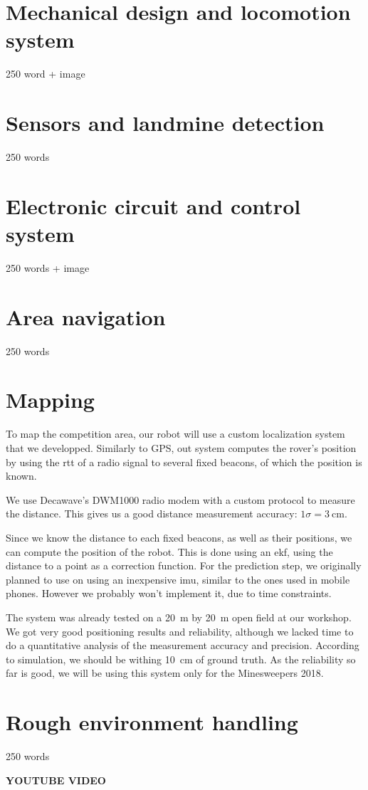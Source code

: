 \section{Mechanical design and locomotion system}
250 word + image

\section{Sensors and landmine detection}
250 words

\section{Electronic circuit and control system}
250 words + image

\section{Area navigation}
250 words

\section{Mapping}

To map the competition area, our robot will use a custom localization system that we developped.
Similarly to GPS, out system computes the rover's position by using the \gls{rtt} of a radio signal to several fixed beacons, of which the position is known.

We use Decawave's DWM1000 radio modem with a custom protocol to measure the distance.
This gives us a good distance measurement accuracy: $1 \sigma = \SI{3}{\centi\meter}$.

Since we know the distance to each fixed beacons, as well as their positions, we can compute the position of the robot.
This is done using an \gls{ekf}, using the distance to a point as a correction function.
For the prediction step, we originally planned to use on using an inexpensive \gls{imu}, similar to the ones used in mobile phones.
However we probably won't implement it, due to time constraints.

The system was already tested on a \SI{20}{\meter} by \SI{20}{\meter} open field at our workshop.
We got very good positioning results and reliability, although we lacked time to do a quantitative analysis of the measurement accuracy and precision.
According to simulation, we should be withing \SI{10}{\centi\meter} of ground truth.
As the reliability so far is good, we will be using this system only for the Minesweepers 2018.


\section{Rough environment handling}

250 words

\textbf{YOUTUBE VIDEO}
